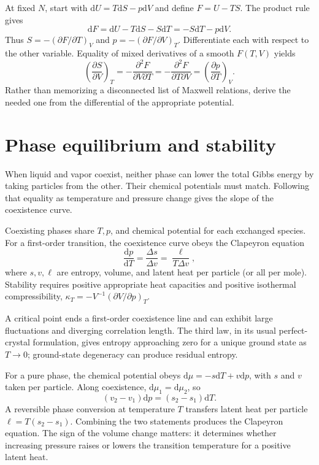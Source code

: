 \documentclass[11pt,oneside]{book}
\newcommand{\dd}{\mathrm{d}}
\newcommand{\pd}[2]{\frac{\partial #1}{\partial #2}}
\newcommand{\od}[2]{\frac{\dd #1}{\dd #2}}
\theoremstyle{reviewstyle}
\begin{document}
At fixed $N$, start with $\dd U=T\dd S-p\dd V$ and define $F=U-TS$. The product rule gives
\begin{equation}
\dd F=\dd U-T\dd S-S\dd T=-S\dd T-p\dd V.
\end{equation}
Thus $S=-(\partial F/\partial T)_V$ and $p=-(\partial F/\partial V)_T$. Differentiate each with respect to the other variable. Equality of mixed derivatives of a smooth $F(T,V)$ yields
\begin{equation}
\left(\pd SV\right)_T=-\frac{\partial^2F}{\partial V\partial T}
=-\frac{\partial^2F}{\partial T\partial V}
=\left(\pd pT\right)_V.
\end{equation}
Rather than memorizing a disconnected list of Maxwell relations, derive the needed one from the differential of the appropriate potential.

\section{Phase equilibrium and stability}
When liquid and vapor coexist, neither phase can lower the total Gibbs energy by taking particles from the other. Their chemical potentials must match. Following that equality as temperature and pressure change gives the slope of the coexistence curve.

Coexisting phases share $T,p$, and chemical potential for each exchanged species. For a first-order transition, the coexistence curve obeys the Clapeyron equation
\begin{equation}\od{p}{T}=\frac{\Delta s}{\Delta v}=\frac{\ell}{T\Delta v},\end{equation}
where $s,v,\ell$ are entropy, volume, and latent heat per particle (or all per mole). Stability requires positive appropriate heat capacities and positive isothermal compressibility,
$\kappa_T=-V^{-1}(\partial V/\partial p)_T$.

A critical point ends a first-order coexistence line and can exhibit large fluctuations and diverging correlation length. The third law, in its usual perfect-crystal formulation, gives entropy approaching zero for a unique ground state as $T\to0$; ground-state degeneracy can produce residual entropy.

For a pure phase, the chemical potential obeys $\dd\mu=-s\dd T+v\dd p$, with $s$ and $v$ taken per particle. Along coexistence, $\dd\mu_1=\dd\mu_2$, so
\begin{equation}
(v_2-v_1)\dd p=(s_2-s_1)\dd T.
\end{equation}
A reversible phase conversion at temperature $T$ transfers latent heat per particle $\ell=T(s_2-s_1)$. Combining the two statements produces the Clapeyron equation. The sign of the volume change matters: it determines whether increasing pressure raises or lowers the transition temperature for a positive latent heat.
\end{document}
